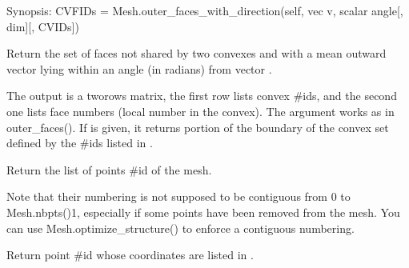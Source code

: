\documentclass[a4paper,11pt,english]{sphinxmanual}
\begin{document}
\begin{fulllineitems}
\begin{fulllineitems}
\end{fulllineitems}


\begin{fulllineitems}
\label{\detokenize{python/cmdref_Mesh:getfem.Mesh.outer_faces_with_direction}}
Synopsis: CVFIDs = Mesh.outer\_faces\_with\_direction(self, vec v, scalar angle{[}, dim{]}{[}, CVIDs{]})

Return the set of faces not shared by two convexes and with a mean outward vector lying within an angle  (in radians) from vector .

The output  is a two\sphinxhyphen{}rows matrix, the first row lists convex
\#ids, and the second one lists face numbers (local number in the
convex). The argument  works as in outer\_faces().
If  is given, it returns portion of the boundary of
the convex set defined by the \#ids listed in .

\end{fulllineitems}


\begin{fulllineitems}
\label{\detokenize{python/cmdref_Mesh:getfem.Mesh.pid}}
Return the list of points \#id of the mesh.

Note that their numbering is not supposed to be contiguous from
0 to Mesh.nbpts()\sphinxhyphen{}1,
especially if some points have been removed from the mesh. You
can use Mesh.optimize\_structure() to enforce a contiguous
numbering.

\end{fulllineitems}


\begin{fulllineitems}
\label{\detokenize{python/cmdref_Mesh:getfem.Mesh.pid_from_coords}}
Return point \#id whose coordinates are listed in .


\end{fulllineitems}
\end{fulllineitems}
\end{document}
